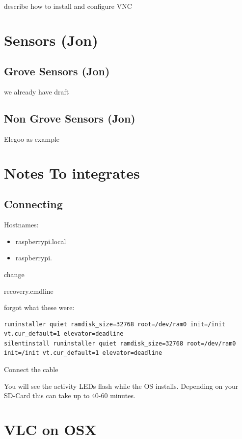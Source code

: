 describe how to install and configure VNC

\section{Sensors (Jon)}\label{sensors-jon}

\subsection{Grove Sensors (Jon)}\label{grove-sensors-jon}

we already have draft

\subsection{Non Grove Sensors (Jon)}\label{non-grove-sensors-jon}

Elegoo as example

\section{Notes To integrates}\label{notes-to-integrates}

\subsection{Connecting}\label{connecting}

Hostnames:

\begin{itemize}
\tightlist
\item
  raspberrypi.local
\item
  raspberrypi.
\end{itemize}

change

recovery.cmdline

forgot what these were:

\begin{verbatim}
runinstaller quiet ramdisk_size=32768 root=/dev/ram0 init=/init vt.cur_default=1 elevator=deadline
silentinstall runinstaller quiet ramdisk_size=32768 root=/dev/ram0 init=/init vt.cur_default=1 elevator=deadline
\end{verbatim}

Connect the cable

You will see the activity LEDs flash while the OS installs. Depending on
your SD-Card this can take up to 40-60 minutes.

\section{VLC on OSX}\label{vlc-on-osx}

